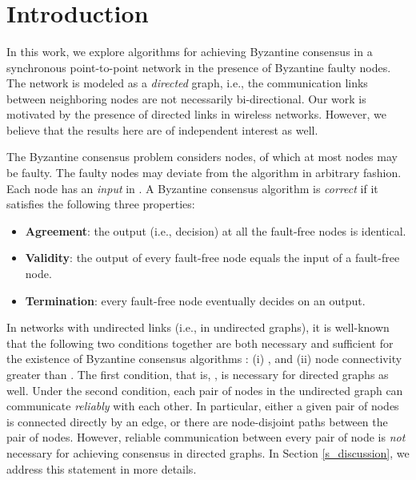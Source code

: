 \documentclass[letterpaper, 11pt]{article}
\begin{document}
~

~




~




\thispagestyle{empty}
\newpage
\setcounter{page}{1}

\section{Introduction}
\label{s_intro}


In this work, we explore algorithms for achieving Byzantine consensus \cite{psl_BG_1982} in a synchronous point-to-point network in the presence of Byzantine faulty nodes. The network is modeled as a {\em directed} graph, i.e., the communication links between neighboring nodes are not necessarily bi-directional. Our work is 
motivated by the presence of directed links in wireless networks.
However, we believe that the results here are of independent interest as well.
 

The Byzantine consensus problem \cite{psl_BG_1982} considers  nodes, of which at most  nodes may be faulty. The faulty nodes may deviate from the algorithm in arbitrary fashion. Each node has an {\em input} in . A Byzantine consensus algorithm is {\em correct} if it satisfies the following three properties:

\begin{itemize}
\item \textbf{Agreement}: the output (i.e., decision) at all the fault-free nodes is identical.

\item \textbf{Validity}: the output of every fault-free node equals the input of a fault-free node.

\item \textbf{Termination}: every fault-free node eventually decides on an output.

\end{itemize}



In networks with undirected links (i.e., in undirected graphs), it is well-known that the following two conditions together are both necessary and sufficient for the existence of Byzantine consensus algorithms \cite{impossible_proof_lynch, welch_book, dolev_82_BG}: (i) , and (ii) node connectivity
greater than . The first condition, that is, , is necessary for directed graphs as well. Under the second condition, each pair of nodes in the undirected graph can
communicate {\em reliably} with each other. In particular, either a given pair of nodes is connected
directly by an edge, or there are  node-disjoint paths between the pair of nodes. However, reliable communication between every pair of node is {\em not} necessary for achieving consensus in directed graphs. In Section \ref{s_discussion}, we address this statement in more details.
\end{document}
